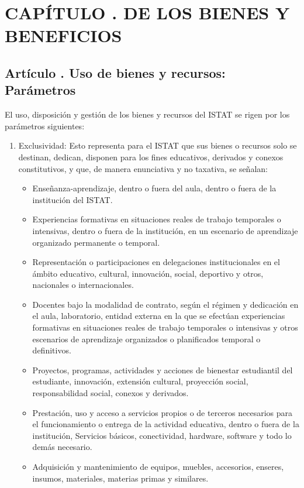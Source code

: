\section{CAPÍTULO . DE LOS BIENES Y BENEFICIOS }
\addtocounter{re}{1}

\subsection{Artículo . Uso de bienes y recursos: Parámetros}
\addtocounter{ns}{1}
El uso, disposición y gestión de los bienes y recursos del ISTAT se rigen por los parámetros siguientes: 
\begin{enumerate}
\item Exclusividad: Esto representa para el ISTAT que sus bienes o recursos solo se destinan, dedican, disponen para los fines educativos, derivados y conexos constitutivos, y que, de manera enunciativa y no taxativa, se señalan: 
\begin{itemize}
\item Enseñanza-aprendizaje, dentro o fuera del aula, dentro o fuera de la institución del ISTAT. 
\item Experiencias formativas en situaciones reales de trabajo temporales o intensivas, dentro o fuera de la institución, en un escenario de aprendizaje organizado permanente o temporal. 
\item Representación o participaciones en delegaciones institucionales en el ámbito educativo, cultural, innovación, social, deportivo y otros, nacionales o internacionales. 
\item Docentes bajo la modalidad de contrato, según el régimen y dedicación en el aula, laboratorio, entidad externa en la que se efectúan experiencias formativas en situaciones reales de trabajo temporales o intensivas y otros escenarios de aprendizaje organizados o planificados temporal o definitivos. 
\item Proyectos, programas, actividades y acciones de bienestar estudiantil del estudiante, innovación, extensión cultural, proyección social, responsabilidad social, conexos y derivados. 
\item Prestación, uso y acceso a servicios propios o de terceros necesarios para el funcionamiento o entrega de la actividad educativa, dentro o fuera de la institución, Servicios básicos, conectividad, hardware, software y todo lo demás necesario. 
\item Adquisición y mantenimiento de equipos, muebles, accesorios, enseres, insumos, materiales, materias primas y similares. 

\end{itemize}
\end{enumerate}
